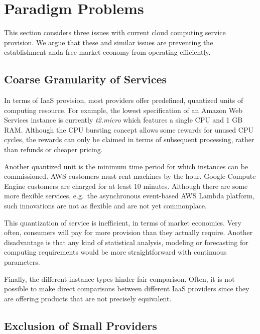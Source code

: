 \documentclass[conference,10pt]{IEEEtran}
\begin{document}

\section{Paradigm Problems}
\label{sec-probs}

This section considers three issues with current cloud computing service provision.
We argue that these and similar issues are preventing the establishment anda free market economy from operating efficiently.


\subsection{Coarse Granularity of Services}

In terms of IaaS provision, most providers offer predefined, quantized units of computing resource. For example, the lowest specification of an Amazon Web Services instance is currently \emph{t2.micro} which features a single CPU and 1 GB RAM. Although the CPU bursting concept allows some rewards for unused CPU cycles, the rewards can only be claimed in terms of subsequent processing, rather than refunds or cheaper pricing.  

Another quantized unit is the minimum time period for which instances can be commissioned. AWS customers must rent machines by the hour. Google Compute Engine customers are charged for at least 10 minutes.
Although there are some more flexible services, e.g.\ the asynchronous event-based AWS Lambda platform, such innovations are not as flexible and are not yet commonplace.

This quantization of service is inefficient, in terms of market economics. Very often, consumers will pay for more provision than they actually require. Another disadvantage is that any kind of statistical analysis, modeling or forecasting for computing requirements would be more straightforward with continuous parameters. 

Finally, the different instance types hinder fair comparison. Often, it is not possible to make direct comparisons between different IaaS providers since they are offering products that are not precisely equivalent.


\subsection{Exclusion of Small Providers}
\end{document}
